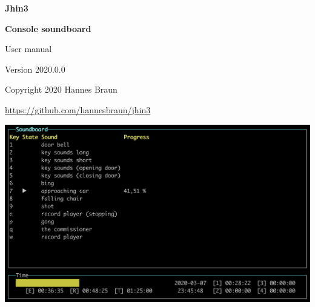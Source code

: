 \documentclass[12pt,a4paper]{article}
\begin{document}

\pagestyle{fancy}
\cfoot{}

\thispagestyle{empty}
\begin{center}
\begin{Huge}
\textbf{Jhin3}
\end{Huge}

\begin{Large}
\vspace{0.4cm}
\textbf{Console soundboard}
\end{Large}

\begin{large}
\vspace{0.1cm}
User manual

\vspace{1cm}

Version 2020.0.0

\vspace{0.7cm}

Copyright \textcopyright{} 2020 Hannes Braun

\href{https://github.com/hannesbraun/jhin3}{https://github.com/hannesbraun/jhin3}
\end{large}

\vspace{2.4cm}
\includegraphics[scale=0.6]{../preview.png}

\end{center}
\newpage

\tableofcontents
\newpage





\end{document}
